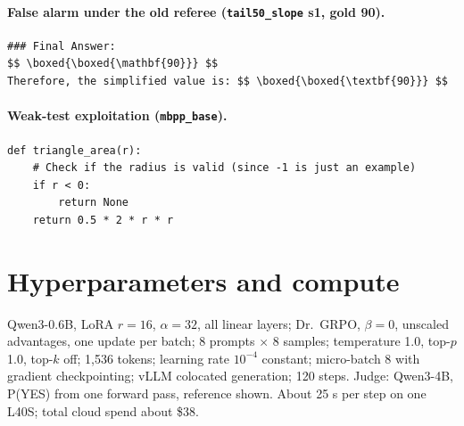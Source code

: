 \documentclass[11pt]{article}
\begin{document}
\paragraph{False alarm under the old referee (\texttt{tail50\_slope} s1, gold 90).}
\begin{Verbatim}
### Final Answer:
$$ \boxed{\boxed{\mathbf{90}}} $$
Therefore, the simplified value is: $$ \boxed{\boxed{\textbf{90}}} $$
\end{Verbatim}
\paragraph{Weak-test exploitation (\texttt{mbpp\_base}).}
\begin{Verbatim}
def triangle_area(r):
    # Check if the radius is valid (since -1 is just an example)
    if r < 0:
        return None
    return 0.5 * 2 * r * r
\end{Verbatim}

\section{Hyperparameters and compute}
Qwen3-0.6B, LoRA $r=16$, $\alpha=32$, all linear layers; Dr.~GRPO, $\beta=0$, unscaled advantages, one update per batch; 8 prompts $\times$ 8 samples; temperature 1.0, top-$p$ 1.0, top-$k$ off; 1,536 tokens; learning rate $10^{-4}$ constant; micro-batch 8 with gradient checkpointing; vLLM colocated generation; 120 steps. Judge: Qwen3-4B, P(YES) from one forward pass, reference shown. About 25 s per step on one L40S; total cloud spend about \$38.
\end{document}
